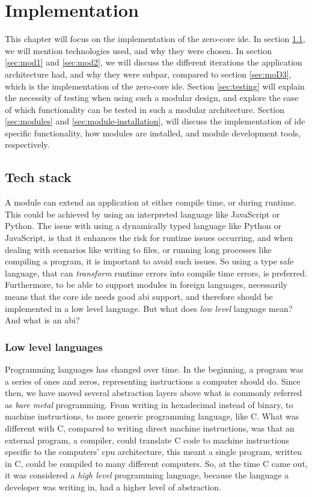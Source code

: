 \chapter{Implementation} \label{cha:impl}

This chapter will focus on the implementation of the zero-core \gls*{ide}. In
section \ref{sec:stack}, we will mention technologies used, and why they were
chosen. In section \ref{sec:mod1} and \ref{sec:mod2}, we will discuss the
different iterations the application architecture had, and why they were subpar,
compared to section \ref{sec:moD3}, which is the implementation of the zero-core
\gls*{ide}. Section \ref{sec:testing} will explain the necessity of testing when
using such a modular design, and explore the ease of which functionality can be
tested in such a modular architecture. Section \ref{sec:modules} and
\ref{sec:module-installation}, will discuss the implementation of \gls{ide}
specific functionality, how modules are installed, and module development tools,
respectively.

\section{Tech stack} \label{sec:stack}

A module can extend an application at either compile time, or during runtime.
This could be achieved by using an interpreted language like JavaScript or
Python. The issue with using a dynamically typed language like Python or
JavaScript, is that it enhances the risk for runtime issues occurring, and when
dealing with scenarios like writing to files, or running long processes like
compiling a program, it is important to avoid such issues. So using a type safe
language, that can \textit{transform} runtime errors into compile time errors,
is preferred. Furthermore, to be able to support modules in foreign languages,
necessarily means that the core \gls*{ide} needs good \gls*{abi} support, and
therefore should be implemented in a low level language. But what does
\textit{low level} language mean? And what is an \gls*{abi}?


\subsection{Low level languages}

Programming languages has changed over time. In the beginning, a program was a
series of ones and zeros, representing instructions a computer should do. Since
then, we have moved several abstraction layers above what is commonly referred
as \textit{bare metal} programming. From writing in hexadecimal instead of
binary, to machine instructions, to more generic programming language, like C.
What was different with C, compared to writing direct machine instructions, was
that an external program, a compiler, could translate C code to machine
instructions specific to the computers' \gls*{cpu} architecture, this meant a
single program, written in C, could be compiled to many different computers. So,
at the time C came out, it was considered a \textit{high level} programming
language, because the language a developer was writing in, had a higher level of
abstraction.

